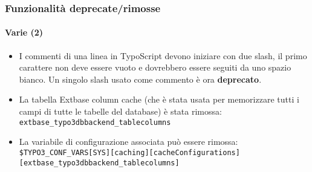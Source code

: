 
\begin{frame}[fragile]
	\frametitle{Funzionalità deprecate/rimosse}
	\framesubtitle{Varie (2)}

	\begin{itemize}

		\item I commenti di una linea in TypoScript devono iniziare con due slash, il primo carattere non deve essere vuoto
			e dovrebbero essere seguiti da uno spazio bianco. Un singolo slash usato come commento è ora \textbf{deprecato}.

		\item La tabella Extbase column cache (che è stata usata per memorizzare tutti i campi di tutte le tabelle del database)
			è stata rimossa:\newline
			\texttt{extbase\_typo3dbbackend\_tablecolumns}

		\item La variabile di configurazione associata può essere rimossa:
			\smaller
				\texttt{\$TYPO3\_CONF\_VARS[SYS][caching][cacheConfigurations]}\newline
				\tabto{0.4cm}\texttt{[extbase\_typo3dbbackend\_tablecolumns]}
			\normalsize

	\end{itemize}

\end{frame}


